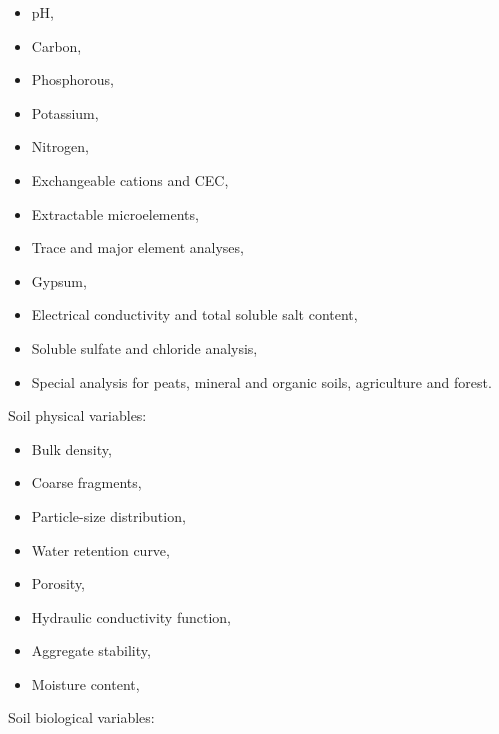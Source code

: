 \documentclass[
  letterpaper,
  DIV=11,
  numbers=noendperiod]{scrreprt}
\providecommand{\tightlist}{%
  \setlength{\itemsep}{0pt}\setlength{\parskip}{0pt}}\usepackage{longtable,booktabs,array}
\begin{document}
\begin{itemize}
\tightlist
\item
  pH,\\
\item
  Carbon,\\
\item
  Phosphorous,\\
\item
  Potassium,\\
\item
  Nitrogen,\\
\item
  Exchangeable cations and CEC,\\
\item
  Extractable microelements,\\
\item
  Trace and major element analyses,\\
\item
  Gypsum,\\
\item
  Electrical conductivity and total soluble salt content,\\
\item
  Soluble sulfate and chloride analysis,\\
\item
  Special analysis for peats, mineral and organic soils, agriculture and
  forest.
\end{itemize}

Soil physical variables:

\begin{itemize}
\tightlist
\item
  Bulk density,\\
\item
  Coarse fragments,\\
\item
  Particle-size distribution,\\
\item
  Water retention curve,\\
\item
  Porosity,\\
\item
  Hydraulic conductivity function,\\
\item
  Aggregate stability,\\
\item
  Moisture content,
\end{itemize}

Soil biological variables:
\end{document}
